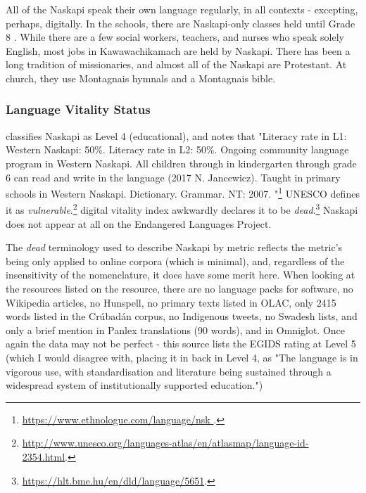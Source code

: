 All of the Naskapi speak their own language regularly, in all contexts - excepting, perhaps, digitally. In the schools, there are Naskapi-only classes held until Grade 8 \cite{llewellyn2017oral}. While there are a few social workers, teachers, and nurses who speak solely English, most jobs in Kawawachikamach are held by Naskapi. There has been a long tradition of missionaries, and almost all of the Naskapi are Protestant. At church, they use Montagnais hymnals and a Montagnais bible.



\subsubsection{Language Vitality Status}
\label{sec:naskapi-vitality-status}


\citet{lewis2009ethnologue} classifies Naskapi as Level 4 (educational), and notes that "Literacy rate in L1: Western Naskapi: 50\%. Literacy rate in L2: 50\%. Ongoing community language program in Western Naskapi. All children through in kindergarten through grade 6 can read and write in the language (2017 N. Jancewicz). Taught in primary schools in Western Naskapi. Dictionary. Grammar. NT: 2007. "\footnote{\href{https://www.ethnologue.com/language/nsk }{https://www.ethnologue.com/language/nsk }. } UNESCO defines it as {\it vulnerable}.\footnote{\href{http://www.unesco.org/languages-atlas/en/atlasmap/language-id-2354.html}{http://www.unesco.org/languages-atlas/en/atlasmap/language-id-2354.html}. }  digital vitality index awkwardly declares it to be {\it dead}.\footnote{\href{https://hlt.bme.hu/en/dld/language/5651}{https://hlt.bme.hu/en/dld/language/5651}. } Naskapi does not appear at all on the Endangered Languages Project.

The {\it dead} terminology used to describe Naskapi by  metric reflects the metric's being only applied to online corpora (which is minimal), and, regardless of the insensitivity of the nomenclature, it does have some merit here. When looking at the resources listed on the resource, there are no language packs for software, no Wikipedia articles, no Hunspell, no primary texts listed in OLAC, only 2415 words listed in the Cr\'ubad\'an corpus, no Indigenous tweets, no Swadesh lists, and only a brief mention in Panlex translations (90 words), and in Omniglot. Once again the data may not be perfect - this source lists the EGIDS rating at Level 5 (which I would disagree with, placing it in back in Level 4, as "The language is in vigorous use, with standardisation and literature being sustained through a widespread system of institutionally supported education.")

